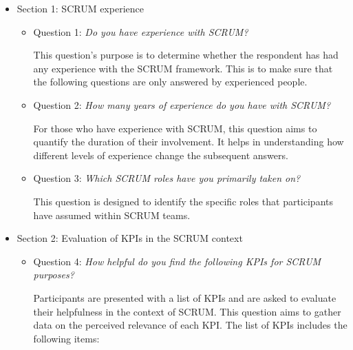 \begin{itemize}
    \item Section 1: SCRUM experience
    \begin{itemize}
        \item Question 1: \textit{Do you have experience with SCRUM?}
        
        This question's purpose is to determine whether the respondent has had any experience with the SCRUM framework. This is to make sure that the following questions are only answered by experienced people.
        \item Question 2: \textit{How many years of experience do you have with SCRUM?}
        
        For those who have experience with SCRUM, this question aims to quantify the duration of their involvement. It helps in understanding how different levels of experience change the subsequent answers.
        \item Question 3: \textit{Which SCRUM roles have you primarily taken on?}
        
        This question is designed to identify the specific roles that participants have assumed within SCRUM teams.
    \end{itemize}

    \item Section 2: Evaluation of KPIs in the SCRUM context
    \begin{itemize}
        \item Question 4: \textit{How helpful do you find the following KPIs for SCRUM purposes?}
        
        Participants are presented with a list of KPIs and are asked to evaluate their helpfulness in the context of SCRUM. This question aims to gather data on the perceived relevance of each KPI.
        The list of KPIs includes the following items:


\end{itemize}
\end{itemize}

